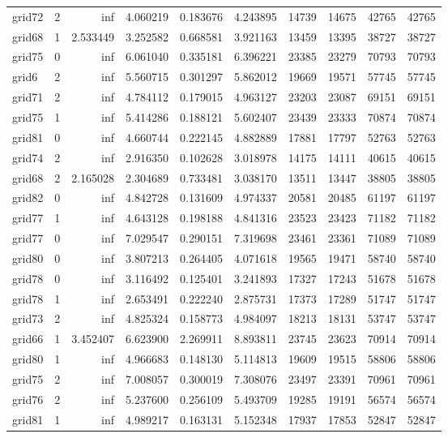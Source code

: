 \begin{longtable}{|l|r|r|r|r|r|r|r|r|r|}
grid72 & 2 & inf & 4.060219 & 0.183676 & 4.243895 & 14739 & 14675 & 42765 & 42765 \\
grid68 & 1 & 2.533449 & 3.252582 & 0.668581 & 3.921163 & 13459 & 13395 & 38727 & 38727 \\
grid75 & 0 & inf & 6.061040 & 0.335181 & 6.396221 & 23385 & 23279 & 70793 & 70793 \\
grid6 & 2 & inf & 5.560715 & 0.301297 & 5.862012 & 19669 & 19571 & 57745 & 57745 \\
grid71 & 2 & inf & 4.784112 & 0.179015 & 4.963127 & 23203 & 23087 & 69151 & 69151 \\
grid75 & 1 & inf & 5.414286 & 0.188121 & 5.602407 & 23439 & 23333 & 70874 & 70874 \\
grid81 & 0 & inf & 4.660744 & 0.222145 & 4.882889 & 17881 & 17797 & 52763 & 52763 \\
grid74 & 2 & inf & 2.916350 & 0.102628 & 3.018978 & 14175 & 14111 & 40615 & 40615 \\
grid68 & 2 & 2.165028 & 2.304689 & 0.733481 & 3.038170 & 13511 & 13447 & 38805 & 38805 \\
grid82 & 0 & inf & 4.842728 & 0.131609 & 4.974337 & 20581 & 20485 & 61197 & 61197 \\
grid77 & 1 & inf & 4.643128 & 0.198188 & 4.841316 & 23523 & 23423 & 71182 & 71182 \\
grid77 & 0 & inf & 7.029547 & 0.290151 & 7.319698 & 23461 & 23361 & 71089 & 71089 \\
grid80 & 0 & inf & 3.807213 & 0.264405 & 4.071618 & 19565 & 19471 & 58740 & 58740 \\
grid78 & 0 & inf & 3.116492 & 0.125401 & 3.241893 & 17327 & 17243 & 51678 & 51678 \\
grid78 & 1 & inf & 2.653491 & 0.222240 & 2.875731 & 17373 & 17289 & 51747 & 51747 \\
grid73 & 2 & inf & 4.825324 & 0.158773 & 4.984097 & 18213 & 18131 & 53747 & 53747 \\
grid66 & 1 & 3.452407 & 6.623900 & 2.269911 & 8.893811 & 23745 & 23623 & 70914 & 70914 \\
grid80 & 1 & inf & 4.966683 & 0.148130 & 5.114813 & 19609 & 19515 & 58806 & 58806 \\
grid75 & 2 & inf & 7.008057 & 0.300019 & 7.308076 & 23497 & 23391 & 70961 & 70961 \\
grid76 & 2 & inf & 5.237600 & 0.256109 & 5.493709 & 19285 & 19191 & 56574 & 56574 \\
grid81 & 1 & inf & 4.989217 & 0.163131 & 5.152348 & 17937 & 17853 & 52847 & 52847 \\

\end{longtable}

